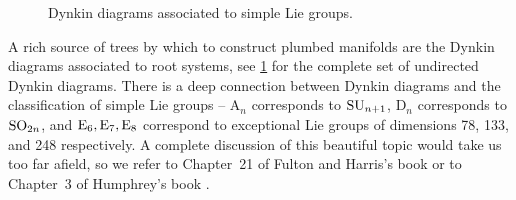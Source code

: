 \begin{figure}[ht]
	\vspace{1em}
	\caption{Dynkin diagrams associated to simple Lie groups.} \label{fig:dynkin-diagram-trees}
\end{figure}

A rich source of trees by which to construct plumbed manifolds are the Dynkin diagrams associated to root systems, see \cref{fig:dynkin-diagram-trees} for the complete set of undirected Dynkin diagrams. There is a deep connection between Dynkin diagrams and the classification of simple Lie groups -- $\mathrm{A}_n$ corresponds to $\mathrm{SU}_{n+1}$, $\mathrm{D}_n$ corresponds to $\mathrm{SO}_{2n}$, and $\mathrm{E}_6, \mathrm{E}_7, \mathrm{E}_8$ correspond to exceptional Lie groups of dimensions 78, 133, and 248 respectively.
A complete discussion of this beautiful topic would take us too far afield, so we refer to Chapter~21 of Fulton and Harris's book \cite{fultonharris1991representation} or to Chapter~3 of Humphrey's book \cite{humphreys1972representation}.


